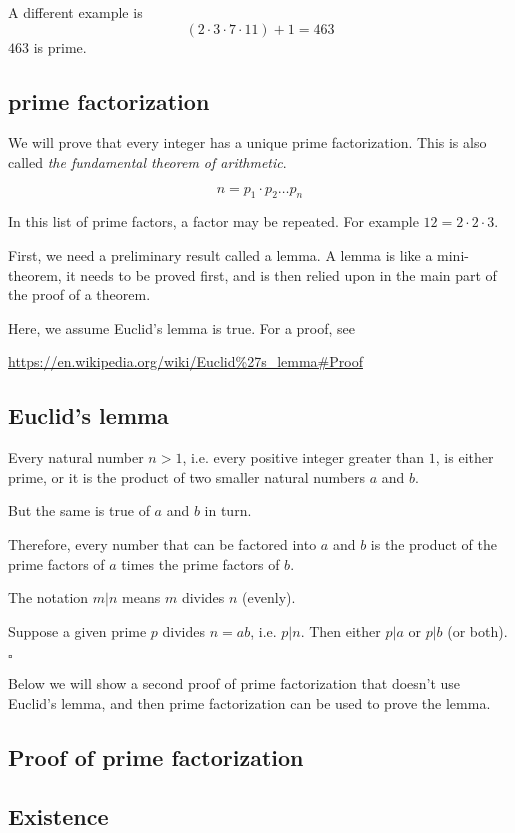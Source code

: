 \documentclass[11pt, oneside]{article}
\begin{document}
A different example is
\[ (2 \cdot 3 \cdot 7 \cdot 11) + 1 = 463 \]
$463$ is prime.

\subsection*{prime factorization}

We will prove that every integer has a unique prime factorization.  This is also called \emph{the fundamental theorem of arithmetic}.

\[ n = p_1 \cdot p_2 \dots p_n \]

In this list of prime factors, a factor may be repeated.  For example $12 = 2 \cdot 2 \cdot 3$.

First, we need a preliminary result called a lemma.  A lemma is like a mini-theorem, it needs to be proved first, and is then relied upon in the main part of the proof of a theorem.

Here, we assume Euclid's lemma is true.  For a proof, see

\url{https://en.wikipedia.org/wiki/Euclid%27s_lemma#Proof}

\subsection*{Euclid's lemma}

Every natural number $n > 1$, i.e. every positive integer greater than $1$, is either prime, or it is the product of two smaller natural numbers $a$ and $b$.

But the same is true of $a$ and $b$ in turn.

Therefore, every number that can be factored into $a$ and $b$ is the product of the prime factors of $a$ times the prime factors of $b$.  

The notation $m|n$ means $m$ divides $n$ (evenly).

Suppose a given prime $p$ divides $n = ab$, i.e. $p|n$.  Then either $p|a$ or  $p|b$ (or both).

$\square$

Below we will show a second proof of prime factorization that doesn't use Euclid's lemma, and then prime factorization can be used to prove the lemma.

\subsection*{Proof of prime factorization}

\subsection*{Existence}
\end{document}
